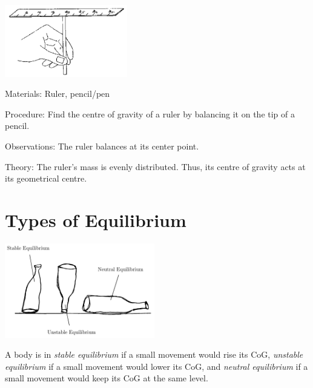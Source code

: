 \begin{multicols}{2}
\begin{center}
\includegraphics[width=0.4\textwidth]{./img/source/cog-ruler.png}
\end{center}

\begin{description*}
\item[Materials:]{Ruler, pencil/pen}
\item[Procedure:]{Find the centre of gravity of a ruler by balancing it on the tip of a pencil.}
\item[Observations:]{The ruler balances at its center point.}
\item[Theory:]{The ruler's mass is evenly distributed. Thus, its centre of gravity acts at its geometrical centre.}
\end{description*}


\section*{Types of Equilibrium}

\begin{center}
\includegraphics[width=0.49\textwidth]{./img/equilibrium.png}
\end{center}

A body is in \emph{stable equilibrium} if a small movement would rise its CoG, \emph{unstable equilibrium} if a small movement would lower its CoG, and \emph{neutral equilibrium} if a small movement would keep its CoG at the same level.


\end{multicols}
